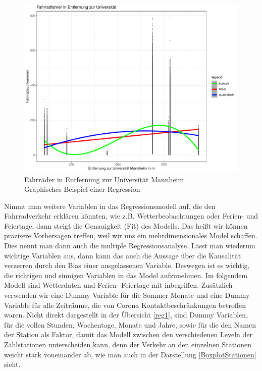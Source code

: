 \documentclass[a4paper,12pt]{thesis}
\begin{document}
\begin{figure}[!ht]
	\centering
	\includegraphics[width=\textwidth]{Plots/Regression_Bsp.pdf}
	\caption{Fahrräder in Entfernung zur Universität Mannheim\\Graphisches Beispiel einer Regression}
	\label{Figure2}
\end{figure}

Nimmt man weitere Variablen in das Regressionsmodell auf, die den Fahrradverkehr erklären könnten, wie z.B. Wetterbeobachtungen oder Ferien- und Feiertage, dann steigt die Genauigkeit (Fit) des Modells. Das heißt wir können präzisere Vorhersagen treffen, weil wir uns ein mehrdimensionales Model schaffen. Dies nennt man dann auch die multiple Regressionsanalyse. Lässt man wiederum wichtige Variablen aus, dann kann das auch die Aussage über die Kausalität verzerren durch den Bias einer ausgelassenen Variable. Deswegen ist es wichtig, die richtigen und sinnigen Variablen in das Model aufzunehmen. Im folgendem Modell sind Wetterdaten und Ferien- Feiertage mit inbegriffen. Zusätzlich verwenden wir eine Dummy Variable für die Sommer Monate und eine Dummy Variable für alle Zeiträume, die von Corona Kontaktbeschränkungen betroffen waren. Nicht direkt dargestellt in der Übersicht \ref{reg1}, sind Dummy Variablen, für die vollen Stunden, Wochentage, Monate und Jahre, sowie für die den Namen der Station als Faktor, damit das Modell zwischen den verschiedenen Leveln der Zählstationen unterscheiden kann, denn der Verkehr an den einzelnen Stationen weicht stark voneinander ab, wie man auch in der Darstellung \ref{BoxplotStationen} sieht.\\
\end{document}
